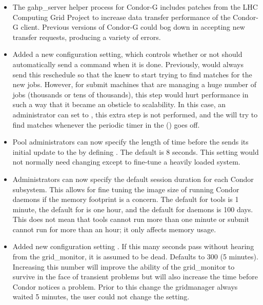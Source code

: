 \begin{itemize}
\item The gahp\_server helper process for Condor-G includes patches from
the LHC Computing Grid Project to increase data transfer performance of
the Condor-G client. Previous versions of Condor-G could bog down in
accepting new transfer requests, producing a variety of errors. 

\item Added a new configuration setting,
   which controls whether or not
   should automatically send a 
  command when it is done.
  Previously,  would always send this reschedule so
  that the  knew to start trying to find matches for
  the new jobs.
  However, for submit machines that are managing a huge number of jobs
  (thousands or tens of thousands), this step would hurt performance
  in such a way that it became an obsticle to scalability.
  In this case, an administrator can set
   to \verb@FALSE@, this extra
  step is not performed, and the  will try to find
  matches whenever the periodic timer in the 
  () goes off.

\item Pool administrators can now specify the length of time before
  the  sends its initial update to the
   by defining
  . 
  The default is 8 seconds.
  This setting would not normally need changing except to fine-tune a
  heavily loaded system.

\item Administrators can now specify the default session duration for
  each Condor subsystem.
  This allows for fine tuning the image size of running Condor daemons
  if the memory footprint is a concern.
  The default for tools is 1 minute, the default for 
  is one hour, and the default for daemons is 100 days.
  This does not mean that tools cannot run more than one minute or
  submit cannot run for more than an hour; it only affects memory
  usage.

\item Added new configuration setting
  .
  If this many
  seconds pass without hearing from the grid\_monitor, it is
  assumed to be dead.  Defaults to 300 (5 minutes).  Increasing
  this number will improve the ability of the grid\_monitor to
  survive in the face of transient problems but will also
  increase the time before Condor notices a problem.  Prior to
  this change the gridmanager always waited 5 minutes, the user
  could not change the setting.


\end{itemize}
